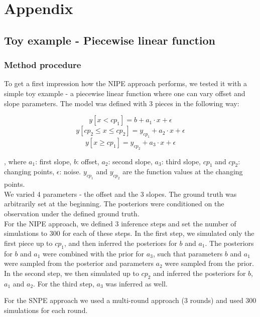 \documentclass[12pt]{extreport}
\begin{document}





\chapter{Appendix}


\section{Toy example - Piecewise linear function}
\label{piecewise_sec}

\subsection{Method procedure}

To get a first impression how the NIPE approach performs, we tested it with a simple toy example - a piecewise linear function where one can vary offset and slope parameters. The model was defined with 3 pieces in the following way:

$$ y[x<cp_1] = b + a_1 \cdot x + \epsilon$$
$$ y[cp_2\leq x\leq cp_2] = y_{cp_1} + a_2 \cdot x +\epsilon$$
$$ y[x \geq cp_1] = y_{cp_2}  + a_3 \cdot x+ \epsilon$$

, where $a_1$: first slope, $b$: offset, $a_2$: second slope, $a_3$: third slope, $cp_1$ and $cp_2$: changing points, $\epsilon$: noise. $y_{cp_1}$ and $y_{cp_2}$ are the function values at the changing points.\\


We varied 4 parameters - the offset and the 3 slopes. The ground truth was arbitrarily set at the beginning. The posteriors were conditioned on the observation under the defined ground truth.  \\

For the NIPE approach, we defined 3 inference steps and set the number of simulations to 300 for each of these steps. In the first step, we simulated only the first piece up to $cp_1$, and then inferred the posteriors for $b$ and $a_1$. The posteriors for $b$ and $a_1$ were combined with the prior for $a_3$, such that parameters $b$ and $a_1$ were sampled from the posterior and parameters $a_2$ were sampled from the prior. In the second step, we then simulated up to $cp_2$ and inferred the posteriors for $b$, $a_1$ and $a_2$. For the third step, $a_3$ was inferred as well.

For the SNPE approach we used a multi-round approach (3 rounds) and used 300 simulations for each round. 
\end{document}
